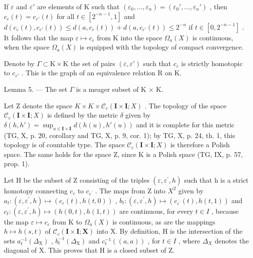 If \(\varepsilon\) and \(\varepsilon'\) are elements of K such that \((\varepsilon_0, \ldots, \varepsilon_n) = (\varepsilon_0', \ldots, \varepsilon_n')\) , then \(c_{\varepsilon}(t) = c_{\varepsilon'}(t)\) for all \(t \in [2^{-n-1}, 1]\) and \(d(c_{\varepsilon}(t), c_{\varepsilon'}(t)) \leqslant d(a, c_{\varepsilon}(t)) + d(a, c_{\varepsilon'}(t)) \leqslant 2^{-n}\) if \(t \in [0, 2^{-n-1}]\) . It follows that the map \(\varepsilon \mapsto c_{\varepsilon}\) from K into the space \(\Omega_a(X)\) is continuous, when the space \(\Omega_a(X)\) is equipped with the topology of compact convergence.

Denote by \(\Gamma \subset \mathrm{K} \times \mathrm{K}\) the set of pairs \((\varepsilon, \varepsilon')\) such that \(c_{\varepsilon}\) is strictly homotopic to \(c_{\varepsilon'}\) . This is the graph of an equivalence relation R on K.

Lemma 5. --- The set \(\Gamma\) is a meager subset of K × K.

Let Z denote the space \(K \times K \times \mathcal{C}_{c}(\mathbf{I} \times \mathbf{I}; X)\) . The topology of the space \(\mathcal{C}_{c}(\mathbf{I} \times \mathbf{I}; X)\) is defined by the metric \(\delta\) given by \(\delta(h, h') = \sup_{u \in \mathbf{I} \times \mathbf{I}} d(h(u), h'(u))\) and it is complete for this metric (TG, X, p. 20, corollary and TG, X, p. 9, cor. 1); by TG, X, p. 24, th. 1, this topology is of countable type. The space \(\mathcal{C}_{c}(\mathbf{I} \times \mathbf{I}; X)\) is therefore a Polish space. The same holds for the space Z, since K is a Polish space (TG, IX, p. 57, prop. 1).

Let H be the subset of Z consisting of the triples \((\varepsilon,\varepsilon^{\prime},h)\) such that h is a strict homotopy connecting \(c_{\varepsilon}\) to \(c_{\varepsilon^{\prime}}\) . The maps from Z into \(X^{2}\) given by \(a_{t}\colon(\varepsilon,\varepsilon^{\prime},h)\mapsto(c_{\varepsilon}(t),h(t,0))\) , \(b_{t}\colon(\varepsilon,\varepsilon^{\prime},h)\mapsto(c_{\varepsilon^{\prime}}(t),h(t,1))\) and \(c_{t}\colon(\varepsilon,\varepsilon^{\prime},h)\mapsto(h(0,t),h(1,t))\) are continuous, for every \(t\in I\) , because the map \(\varepsilon\mapsto c_{\varepsilon}\) from K to \(\Omega_{a}(X)\) is continuous, as are the mappings \(h\mapsto h(s,t)\) of \(\mathcal{C}_{c}(\mathbf{I}\times\mathbf{I};\mathbf{X})\) into X. By definition, H is the intersection of the sets \(a_{t}^{-1}(\Delta_{\mathrm{X}})\) , \(b_{t}^{-1}(\Delta_{\mathrm{X}})\) and \(c_{t}^{-1}((a,a))\) , for \(t\in I\) , where \(\Delta_{X}\) denotes the diagonal of X. This proves that H is a closed subset of Z.

